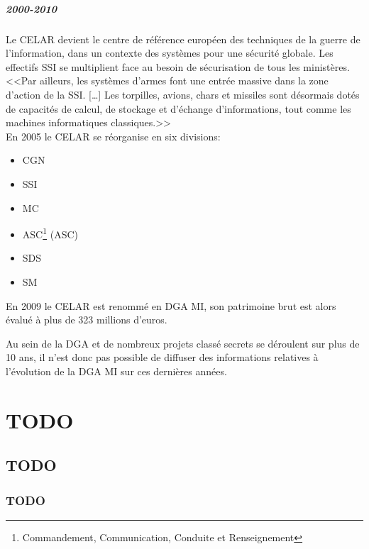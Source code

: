 \documentclass[11pt, book, english, french, standardlists]{upmethodology-document}
\begin{document}
				\paragraph*{2000-2010}
					Le \gls{CELAR} devient le centre de référence européen des techniques de la guerre de l'information, dans un contexte des systèmes pour une sécurité globale. Les effectifs \gls{SSI} se multiplient face au besoin de sécurisation de tous les ministères. <<Par ailleurs, les systèmes d'armes font une entrée massive dans la zone d'action de la \gls{SSI}. [\ldots] Les torpilles, avions, chars et missiles sont désormais dotés de capacités de calcul, de stockage et d'échange d'informations, tout comme les machines informatiques classiques.>>\cite{CELAR40ansAvenir}\\
					En 2005 le \gls{CELAR} se réorganise en six divisions:
					\begin{itemize}
						\item \acrfull{CGN}
						\item \acrfull{SSI}
						\item \acrfull{MC}
						\item \acrlong{ASC}\footnote{Commandement, Communication, Conduite et Renseignement} (\acrshort{ASC})
						\item \acrfull{SDS}
						\item \acrfull{SM}
					\end{itemize}
					En 2009 le \gls{CELAR} est renommé en \acrfull{DGA MI}, son patrimoine brut est alors évalué à plus de 323 millions d'euros.
				\noindent\vspace{-7mm}
					\begin{upmcaution}
						Au sein de la \gls{DGA} et de nombreux projets classé secrets se déroulent sur plus de 10 ans, il n'est donc pas possible de diffuser des informations relatives à l'évolution de la \gls{DGA MI} sur ces dernières années.
					\end{upmcaution}
	\chapter{TODO}
		\section{TODO}
			\subsection{TODO}
\end{document}
